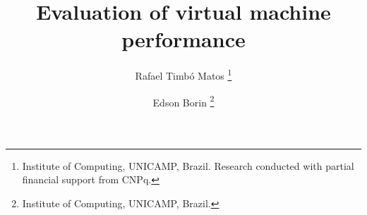\documentclass[11pt,twoside]{article}
\begin{document}
% 

%





%
\pagestyle{myheadings}

%
\title{Evaluation of virtual machine performance}

\author{Rafael Timbó Matos
  \thanks{Institute of Computing, UNICAMP, Brazil.
    Research conducted with partial financial support from CNPq.
  }\and
  Edson Borin
  \thanks{Institute of Computing, UNICAMP, Brazil.
  }
}

\date{}

\maketitle

\newcommand{\syscall}[1]{\emph{#1}}
\newcommand{\printcounter}[1]{}
\newcommand{\echocounter}[1]{%
	\csname the#1\endcsname \stepcounter{#1}
}
\end{document}
